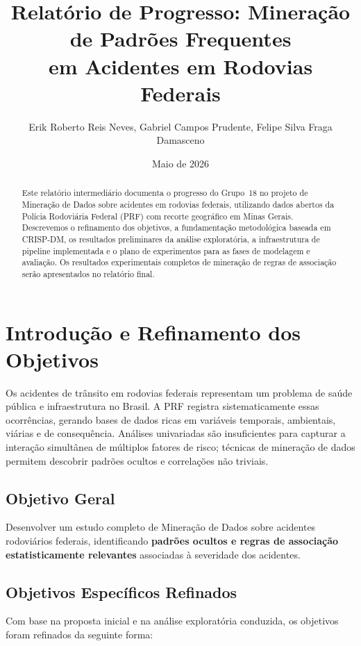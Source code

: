 \documentclass[12pt]{article}
\title{Relatório de Progresso: Mineração de Padrões Frequentes \\ em Acidentes em Rodovias Federais}
\author{Erik Roberto Reis Neves, Gabriel Campos Prudente, Felipe Silva Fraga Damasceno}
\date{Maio de 2026}
\begin{document}
\maketitle

\begin{abstract}
Este relatório intermediário documenta o progresso do Grupo~18 no projeto de Mineração de Dados sobre acidentes em rodovias federais, utilizando dados abertos da Polícia Rodoviária Federal (PRF) com recorte geográfico em Minas Gerais. Descrevemos o refinamento dos objetivos, a fundamentação metodológica baseada em CRISP-DM, os resultados preliminares da análise exploratória, a infraestrutura de pipeline implementada e o plano de experimentos para as fases de modelagem e avaliação. Os resultados experimentais completos de mineração de regras de associação serão apresentados no relatório final.
\end{abstract}

\section{Introdução e Refinamento dos Objetivos}

Os acidentes de trânsito em rodovias federais representam um problema de saúde pública e infraestrutura no Brasil. A PRF registra sistematicamente essas ocorrências, gerando bases de dados ricas em variáveis temporais, ambientais, viárias e de consequência. Análises univariadas são insuficientes para capturar a interação simultânea de múltiplos fatores de risco; técnicas de mineração de dados permitem descobrir padrões ocultos e correlações não triviais.

\subsection{Objetivo Geral}

Desenvolver um estudo completo de Mineração de Dados sobre acidentes rodoviários federais, identificando \textbf{padrões ocultos e regras de associação estatisticamente relevantes} associadas à severidade dos acidentes.

\subsection{Objetivos Específicos Refinados}

Com base na proposta inicial e na análise exploratória conduzida, os objetivos foram refinados da seguinte forma:
\end{document}
